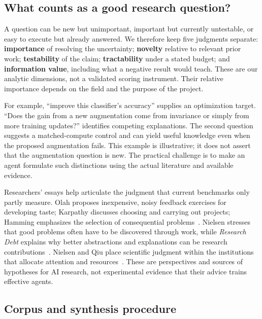 \subsection{What counts as a good research question?}

A question can be new but unimportant, important but currently untestable, or easy to execute but already answered. We therefore keep five judgments separate: \textbf{importance} of resolving the uncertainty; \textbf{novelty} relative to relevant prior work; \textbf{testability} of the claim; \textbf{tractability} under a stated budget; and \textbf{information value}, including what a negative result would teach. These are our analytic dimensions, not a validated scoring instrument. Their relative importance depends on the field and the purpose of the project.

For example, ``improve this classifier's accuracy'' supplies an optimization target. ``Does the gain from a new augmentation come from invariance or simply from more training updates?'' identifies competing explanations. The second question suggests a matched-compute control and can yield useful knowledge even when the proposed augmentation fails. This example is illustrative; it does not assert that the augmentation question is new. The practical challenge is to make an agent formulate such distinctions using the actual literature and available evidence.

Researchers' essays help articulate the judgment that current benchmarks only partly measure. Olah proposes inexpensive, noisy feedback exercises for developing taste; Karpathy discusses choosing and carrying out projects; Hamming emphasizes the selection of consequential problems~\cite{colah-taste-exercises,karpathy-phd-guide,hamming-you-and-your-research}. Nielsen stresses that good problems often have to be discovered through work, while \emph{Research Debt} explains why better abstractions and explanations can be research contributions~\cite{nielsen-research-heuristics,research-debt}. Nielsen and Qiu place scientific judgment within the institutions that allocate attention and resources~\cite{vision-of-metascience}. These are perspectives and sources of hypotheses for AI research, not experimental evidence that their advice trains effective agents.

\subsection{Corpus and synthesis procedure}

